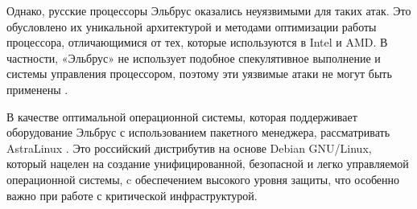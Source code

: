 Однако, русские процессоры Эльбрус оказались неуязвимыми для таких атак. Это обусловлено их уникальной архитектурой и методами оптимизации работы процессора, отличающимися от тех, которые используются в Intel и AMD. В частности, «Эльбрус» не использует подобное спекулятивное выполнение и системы управления процессором, поэтому эти уязвимые атаки не могут быть применены \cite{risk:elbrus_no_spectre}.


В качестве оптимальной операционной системы, которая поддерживает оборудование Эльбрус с использованием пакетного менеджера, рассматривать AstraLinux \cite{dev:astra_linux}. Это российский дистрибутив на основе Debian GNU/Linux, который нацелен на создание унифицированной, безопасной и легко управляемой операционной системы, c обеспечением высокого уровня защиты, что особенно важно при работе с критической инфраструктурой.


